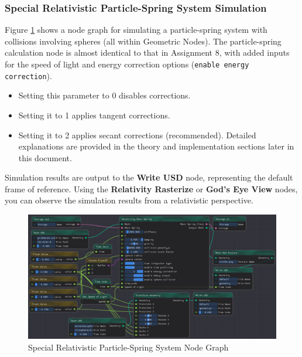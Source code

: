 \documentclass{article}
\begin{document}
\subsubsection*{Special Relativistic Particle-Spring System Simulation}
Figure \ref{massspirng} shows a node graph for simulating a particle-spring system with collisions involving spheres (all within Geometric Nodes). The particle-spring calculation node is almost identical to that in Assignment 8, with added inputs for the speed of light and energy correction options (\lstinline|enable energy correction|). 
\begin{itemize}
    \item Setting this parameter to 0 disables corrections.
    \item Setting it to 1 applies tangent corrections.
    \item Setting it to 2 applies secant corrections (recommended). Detailed explanations are provided in the theory and implementation sections later in this document.
\end{itemize}

Simulation results are output to the \textbf{Write USD} node, representing the default frame of reference. Using the \textbf{Relativity Rasterize} or \textbf{God's Eye View} nodes, you can observe the simulation results from a relativistic perspective.

\begin{figure}[htbp]
    \centering
    \setlength{\abovecaptionskip}{0.cm}
    \begin{minipage}[b]{0.85\linewidth}
        \centering
        \includegraphics[width=\textwidth]{MassSpring.png}
        \caption{Special Relativistic Particle-Spring System Node Graph}
        \label{massspirng}
    \end{minipage}
\end{figure}

\newpage
\end{document}
